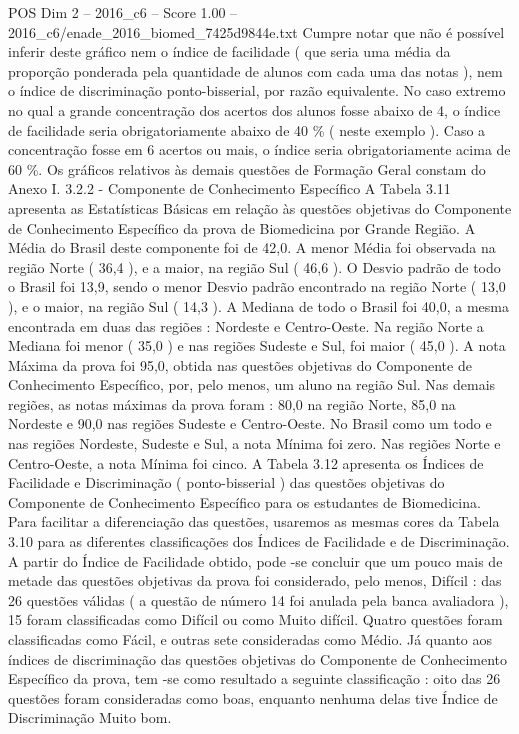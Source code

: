 \begin{textsample}{POS Dim 2 – 2016\_c6 – Score 1.00 – 2016\_c6/enade\_2016\_biomed\_7425d9844e.txt}
Cumpre notar que não é possível inferir deste gráfico nem o índice de facilidade ( que seria uma média da proporção ponderada pela quantidade de alunos com cada uma das notas ), nem o índice de discriminação ponto-bisserial, por razão equivalente.
No caso extremo no qual a grande concentração dos acertos dos alunos fosse abaixo de 4, o índice de facilidade seria obrigatoriamente abaixo de 40 \% ( neste exemplo ).
Caso a concentração fosse em 6 acertos ou mais, o índice seria obrigatoriamente acima de 60 \%.
Os gráficos relativos às demais questões de Formação Geral constam do Anexo I. 3.2.2 - Componente de Conhecimento Específico A Tabela 3.11 apresenta as Estatísticas Básicas em relação às questões objetivas do Componente de Conhecimento Específico da prova de Biomedicina por Grande Região.
A Média do Brasil deste componente foi de 42,0.
A menor Média foi observada na região Norte ( 36,4 ), e a maior, na região Sul ( 46,6 ).
O Desvio padrão de todo o Brasil foi 13,9, sendo o menor Desvio padrão encontrado na região Norte ( 13,0 ), e o maior, na região Sul ( 14,3 ).
A Mediana de todo o Brasil foi 40,0, a mesma encontrada em duas das regiões : Nordeste e Centro-Oeste.
Na região Norte a Mediana foi menor ( 35,0 ) e nas regiões Sudeste e Sul, foi maior ( 45,0 ).
A nota Máxima da prova foi 95,0, obtida nas questões objetivas do Componente de Conhecimento Específico, por, pelo menos, um aluno na região Sul.
Nas demais regiões, as notas máximas da prova foram : 80,0 na região Norte, 85,0 na Nordeste e 90,0 nas regiões Sudeste e Centro-Oeste.
No Brasil como um todo e nas regiões Nordeste, Sudeste e Sul, a nota Mínima foi zero.
Nas regiões Norte e Centro-Oeste, a nota Mínima foi cinco.
A Tabela 3.12 apresenta os Índices de Facilidade e Discriminação ( ponto-bisserial ) das questões objetivas do Componente de Conhecimento Específico para os estudantes de Biomedicina.
Para facilitar a diferenciação das questões, usaremos as mesmas cores da Tabela 3.10 para as diferentes classificações dos Índices de Facilidade e de Discriminação.
A partir do Índice de Facilidade obtido, pode -se concluir que um pouco mais de metade das questões objetivas da prova foi considerado, pelo menos, Difícil : das 26 questões válidas ( a questão de número 14 foi anulada pela banca avaliadora ), 15 foram classificadas como Difícil ou como Muito difícil.
Quatro questões foram classificadas como Fácil, e outras sete consideradas como Médio.
Já quanto aos índices de discriminação das questões objetivas do Componente de Conhecimento Específico da prova, tem -se como resultado a seguinte classificação : oito das 26 questões foram consideradas como boas, enquanto nenhuma delas tive Índice de Discriminação Muito bom.

\end{textsample}
